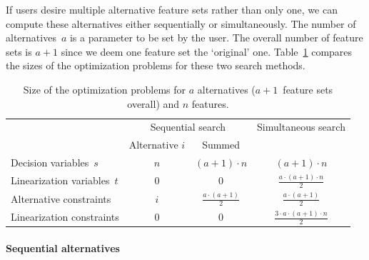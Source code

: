 \documentclass{article}
\theoremstyle{definition}
\begin{document}
If users desire multiple alternative feature sets rather than only one, we can compute these alternatives either sequentially or simultaneously.
The number of alternatives~$a$ is a parameter to be set by the user.
The overall number of feature sets is $a + 1$ since we deem one feature set the `original' one.
Table~\ref{tab:afs:seq-sim-comparison} compares the sizes of the optimization problems for these two search methods.
%
\begin{table}[t]
	\centering
	\renewcommand*{\arraystretch}{1.3}
	\begin{tabular}{lccc}
		\toprule
		& \multicolumn{2}{c}{Sequential search} & Simultaneous search \\
		\cmidrule(r){2-3}
		& Alternative $i$ & Summed & \\
		\midrule
		Decision variables~$s$ & $n$ & $ (a+1) \cdot n$ & $(a+1) \cdot n$ \\
		Linearization variables~$t$ & $0$ & $0$ & $\frac{a \cdot (a+1) \cdot n}{2}$ \\
		Alternative constraints & $i$ & $\frac{a \cdot (a+1)}{2}$ & $\frac{a \cdot (a+1)}{2}$ \\
		Linearization constraints & $0$ & $0$ & $\frac{3 \cdot a \cdot (a+1) \cdot n}{2}$ \\
		\bottomrule
	\end{tabular}
	\caption{Size of the optimization problems for $a$ alternatives ($a + 1$~feature sets overall) and $n$ features.}
	\label{tab:afs:seq-sim-comparison}
\end{table}

\paragraph{Sequential alternatives}
\end{document}
